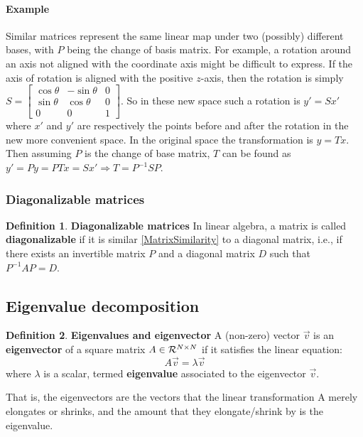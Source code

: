 \documentclass[12pt, letterpaper]{article}
\theoremstyle{definition}
\newtheorem{definition}{Definition}[section]
\let\tb\textbf
\begin{document}
\paragraph{\tb{Example}} Similar matrices represent the same linear map under two (possibly) different bases, with $P$ being the change of basis matrix. For example, a rotation around an axis not aligned with the coordinate axis might be difficult to express.  If the axis of rotation is aligned with the positive $z$-axis, then the rotation is simply $S =\begin{bmatrix}\cos \theta &-\sin \theta &0\\\sin \theta &\cos \theta &0\\0&0&1\end{bmatrix}$. So in these new space such a rotation is $y' = Sx'$ where $x'$ and $y'$ are respectively the points before and after the rotation in the new more convenient space. 
In the original space the transformation is $y = Tx$. Then assuming $P$ is the change of base matrix, $T$ can be found as $y' = P y = PTx= S x' \Rightarrow T = P^{-1} S P$.

\subsubsection{Diagonalizable matrices}
\begin{definition}{\tb{Diagonalizable matrices}} In linear algebra, a matrix is called \tb{diagonalizable} if it is similar \ref{MatrixSimilarity} to a diagonal matrix, i.e., if there exists an invertible matrix $P$ and a diagonal matrix $D$ such that $P^{-1}AP =D$.
\end{definition}

\subsection{Eigenvalue decomposition}
\begin{definition}{\tb{Eigenvalues and eigenvector}}
A (non-zero) vector $\vec{v}$ is an \tb{eigenvector} of a square matrix $A \in \CMcal{R}^{N\times N}$ if it satisfies the linear equation:
\begin{equation}
A\vec{v} = \lambda \vec{v}
\label{eigenvector}
\end{equation}
where $\lambda$ is a scalar, termed \tb{eigenvalue} associated to the eigenvector $\vec{v}$. 
\end{definition}
That is, the eigenvectors are the vectors that the linear transformation A merely elongates or shrinks, and the amount that they elongate/shrink by is the eigenvalue.
\end{document}
